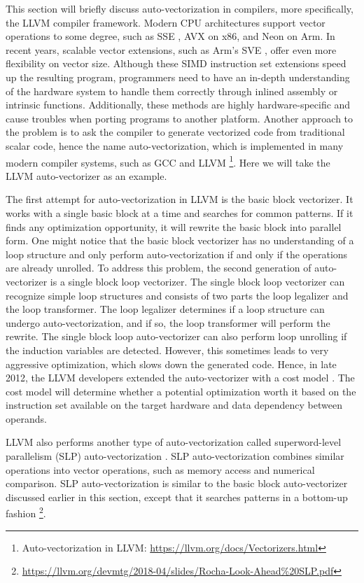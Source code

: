 This section will briefly discuss auto-vectorization in compilers, more
specifically, the LLVM compiler framework. Modern CPU architectures support
vector operations to some degree, such as SSE \cite{sse-intel},
AVX \cite{avx-intel} on x86, and Neon \cite{arm-neon} on Arm. In recent years,
scalable vector extensions, such as Arm's SVE \cite{arm-sve}, offer even more
flexibility on vector size. Although these SIMD instruction set extensions
speed up the resulting program, programmers need to have an in-depth
understanding of the hardware system to handle them correctly through inlined
assembly or intrinsic functions. Additionally, these methods are highly
hardware-specific and cause troubles when porting programs to another platform.
Another approach to the problem is to ask the compiler to generate vectorized
code from traditional scalar code, hence the name auto-vectorization, which
is implemented in many modern compiler systems, such as GCC \cite{auto-vec-gcc}
and LLVM \footnote{Auto-vectorization in LLVM:
    \url{https://llvm.org/docs/Vectorizers.html}}. Here we will take the
LLVM auto-vectorizer as an example.

The first attempt for auto-vectorization in LLVM is the basic block vectorizer.
It works with a single basic block at a time and searches for common patterns.
If it finds any optimization opportunity, it will rewrite the basic block into
parallel form. One might notice that the basic block vectorizer has no
understanding of a loop structure and only perform auto-vectorization if and
only if the operations are already unrolled. To address this problem, the
second generation of auto-vectorizer is a single block loop vectorizer. The
single block loop vectorizer can recognize simple loop structures and consists
of two parts the loop legalizer and the loop transformer. The loop legalizer
determines if a loop structure can undergo auto-vectorization, and if so, the
loop transformer will perform the rewrite. The single block loop auto-vectorizer
can also perform loop unrolling if the induction variables are detected.
However, this sometimes leads to very aggressive optimization, which slows down
the generated code. Hence, in late 2012, the LLVM developers extended the
auto-vectorizer with a cost model \cite{llvm-vec-cost, llvm-vec-cost-avx}. The
cost model will determine whether a potential optimization worth it based on the
instruction set available on the target hardware and data dependency between
operands.

LLVM also performs another type of auto-vectorization called superword-level
parallelism (SLP) auto-vectorization \cite{slp-vectorization}. SLP
auto-vectorization combines similar
operations into vector operations, such as memory access and numerical
comparison. SLP auto-vectorization is similar to the basic block auto-vectorizer
discussed earlier in this section, except that it searches patterns in a
bottom-up fashion \footnote{
    \url{https://llvm.org/devmtg/2018-04/slides/Rocha-Look-Ahead\%20SLP.pdf}}.


